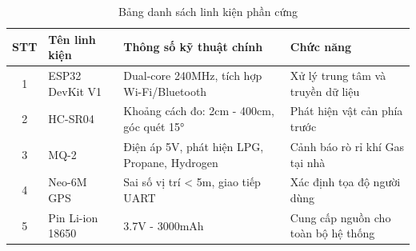 \begin{table}[htbp]
    \centering
    \caption{Bảng danh sách linh kiện phần cứng}
    \begin{tabular}{|c|p{2cm}|p{4cm}|p{4cm}|}
        \hline
        \textbf{STT} & \textbf{Tên linh kiện} & \textbf{Thông số kỹ thuật chính} & \textbf{Chức năng} \\
        \hline
        1 & ESP32 DevKit V1 & Dual-core 240MHz, tích hợp Wi-Fi/Bluetooth & Xử lý trung tâm và truyền dữ liệu \\
        \hline
        2 & HC-SR04 & Khoảng cách đo: 2cm - 400cm, góc quét 15° & Phát hiện vật cản phía trước \\
        \hline
        3 & MQ-2 & Điện áp 5V, phát hiện LPG, Propane, Hydrogen & Cảnh báo rò rỉ khí Gas tại nhà \\
        \hline
        4 & Neo-6M GPS & Sai số vị trí < 5m, giao tiếp UART & Xác định tọa độ người dùng \\
        \hline
        5 & Pin Li-ion 18650 & 3.7V - 3000mAh & Cung cấp nguồn cho toàn bộ hệ thống \\
        \hline
    \end{tabular}
    \label{tab:linhkien}
\end{table}
